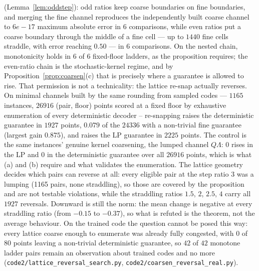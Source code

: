 \documentclass[11pt]{article}
\begin{document}
(Lemma~\ref{lem:oddstep}): odd ratios keep coarse boundaries on fine boundaries, and merging
the fine channel reproduces the independently built coarse channel to
$6e-17$ maximum absolute error in $6$ comparisons, while even
ratios put a coarse boundary through the middle of a fine cell --- up to
$1440$ fine cells straddle, with error reaching
$0.50$ --- in $6$ comparisons. On the nested
chain, monotonicity holds in $6$ of $6$ fixed-floor ladders, as the proposition
requires; the even-ratio chain is the stochastic-kernel regime, and by Proposition~\ref{prop:coarsen}(c) that is precisely where a guarantee is allowed to rise. That permission is not a technicality: the lattice re-snap actually reverses. On minimal channels built by the same rounding from sampled codes --- $1165$ instances, $26916$ (pair, floor) points scored at a fixed floor by exhaustive enumeration of every deterministic decoder -- re-snapping raises the deterministic guarantee in $1927$ points, $0.079$ of the $24336$ with a non-trivial fine guarantee (largest gain $0.875$), and raises the LP guarantee in $2225$ points. The control is the same instances' genuine kernel coarsening, the lumped channel $Q\Lambda$: $0$ rises in the LP and $0$ in the deterministic guarantee over all $26916$ points, which is what (a) and (b) require and what validates the enumeration. The lattice geometry decides which pairs can reverse at all: every eligible pair at the step ratio $3$ was a lumping (1165 pairs, none straddling), so those are covered by the proposition and are not testable violations, while the straddling ratios $1.5$, $2$, $2.5$, $4$ carry all $1927$ reversals. Downward is still the norm: the mean change is negative at every straddling ratio (from $-0.15$ to $-0.37$), so what is refuted is the theorem, not the average behaviour. On the trained code the question cannot be posed this way: every lattice coarse enough to enumerate was already fully congested, with $0$ of $80$ points leaving a non-trivial deterministic guarantee, so $42$ of $42$ monotone ladder pairs remain an observation about trained codes and no more (\texttt{code2/lattice\_reversal\_search.py}, \texttt{code2/coarsen\_reversal\_real.py}).

\begin{table}[t]\centering\footnotesize
\setlength{\tabcolsep}{3pt}
\caption{Rate--congestion ladders on three trained VIB codes (the two FashionMNIST seeds and
MNIST), LP guarantee $t^\star$ at each lattice step $\delta/\hat\sigma$. Within a ladder the
deployed mean-decode accuracy is constant by construction; $\hat\sigma$ is the standard deviation
of the encoder's mean outputs, so the steps are comparable across codes.}
\label{tab:ratemulti}
\resizebox{\textwidth}{!}{}
\end{table}
\end{document}
